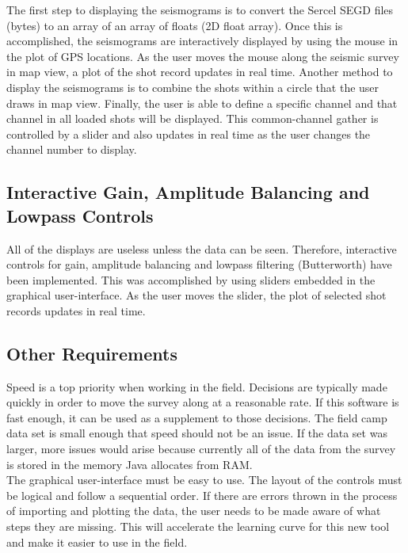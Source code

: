 \documentclass[12pt]{article}
\begin{document}
The first step to displaying the seismograms is to convert the Sercel SEGD files (bytes) to an array of an array of floats (2D float array). Once this is accomplished, the seismograms are interactively displayed by using the mouse in the plot of GPS locations. As the user moves the mouse along the seismic survey in map view, a plot of the shot record updates in real time. Another method to display the seismograms is to combine the shots within a circle that the user draws in map view. Finally, the user is able to define a specific channel and that channel in all loaded shots will be displayed. This common-channel gather is controlled by a slider and also updates in real time as the user changes the channel number to display. \\

\subsection{Interactive Gain, Amplitude Balancing and Lowpass Controls}

All of the displays are useless unless the data can be seen. Therefore, interactive controls for gain, amplitude balancing and lowpass filtering (Butterworth) have been implemented. This was accomplished by using sliders embedded in the graphical user-interface. As the user moves the slider, the plot of selected shot records updates in real time.

\subsection{Other Requirements}

Speed is a top priority when working in the field. Decisions are typically made quickly in order to move the survey along at a reasonable rate. If this software is fast enough, it can be used as a supplement to those decisions. The field camp data set is small enough that speed should not be an issue. If the data set was larger, more issues would arise because currently all of the data from the survey is stored in the memory Java allocates from RAM.\\

The graphical user-interface must be easy to use. The layout of the controls must be logical and follow a sequential order.  If there are errors thrown in the process of importing and plotting the data, the user needs to be made aware of what steps they are missing. This will accelerate the learning curve for this new tool and make it easier to use in the field.
\end{document}
